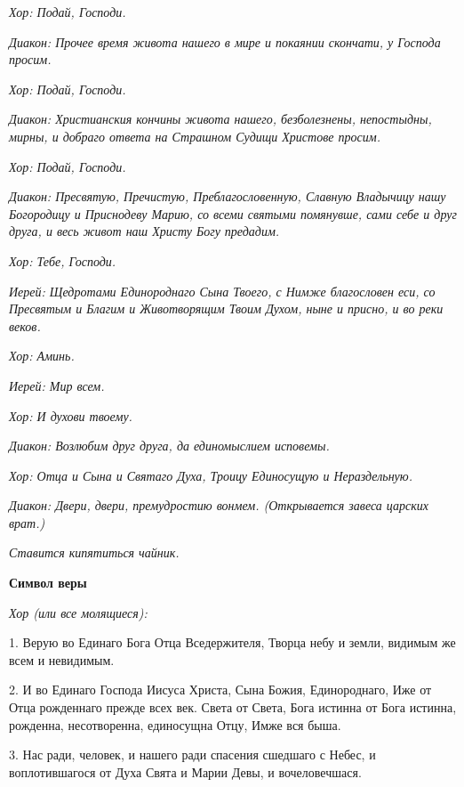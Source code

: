 \itshape Хор:\normalfont{} Подай, Господи.


\itshape Диакон:\normalfont{} Прочее время живота нашего в мире и покаянии скончати, у Господа просим.


\itshape Хор:\normalfont{} Подай, Господи.


\itshape Диакон:\normalfont{} Христианския кончины живота нашего, безболезнены, непостыдны, мирны, и добраго ответа на Страшном Судищи Христове просим.


\itshape Хор:\normalfont{} Подай, Господи.


\itshape Диакон:\normalfont{} Пресвятую, Пречистую, Преблагословенную, Славную Владычицу нашу Богородицу и Приснодеву Марию, со всеми святыми помянувше, сами себе и друг друга, и весь живот наш Христу Богу предадим.


\itshape Хор:\normalfont{} Тебе, Господи.


\itshape Иерей:\normalfont{} Щедротами Единороднаго Сына Твоего, с Нимже благословен еси, со Пресвятым и Благим и Животворящим Твоим Духом, ныне и присно, и во реки веков.


\itshape Хор:\normalfont{} Аминь.


\itshape Иерей:\normalfont{} Мир всем.


\itshape Хор:\normalfont{} И духови твоему.


\itshape Диакон:\normalfont{} Возлюбим друг друга, да единомыслием исповемы.


\itshape Хор:\normalfont{} Отца и Сына и Святаго Духа, Троицу Единосущую и Нераздельную.


\itshape Диакон:\normalfont{} Двери, двери, премудростию вонмем. \itshape (Открывается завеса царских врат.)\normalfont{}


\itshape Ставится кипятиться чайник.\normalfont{}





\bfseries  Символ веры\normalfont{}


\itshape Хор (или все молящиеся):\normalfont{}



1. Верую во Единаго Бога Отца Вседержителя, Творца небу и земли, видимым же всем и невидимым.


2. И во Единаго Господа Иисуса Христа, Сына Божия, Единороднаго, Иже от Отца рожденнаго прежде всех век. Света от Света, Бога истинна от Бога истинна, рожденна, несотворенна, единосущна Отцу, Имже вся быша.


3. Нас ради, человек, и нашего ради спасения сшедшаго с Небес, и воплотившагося от Духа Свята и Марии Девы, и вочеловечшася.


